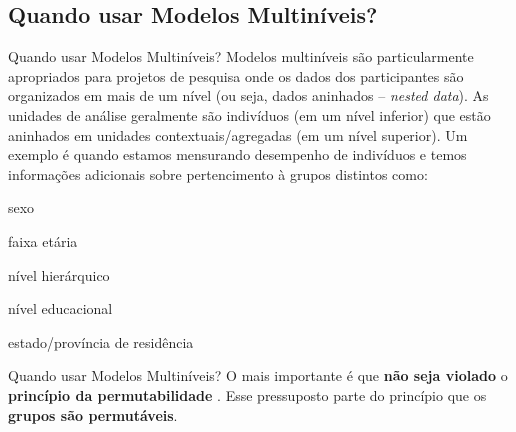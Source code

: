 \subsection{Quando usar Modelos Multiníveis?}
\begin{frame}{Quando usar Modelos Multiníveis?}
    Modelos multiníveis são particularmente apropriados para projetos de pesquisa
    onde os dados dos participantes são organizados em mais de um nível
    (ou seja, dados aninhados -- \textit{nested data}).
    As unidades de análise geralmente são indivíduos (em um nível inferior)
    que estão aninhados em unidades contextuais/agregadas (em um nível superior).
    \vfill
    \small
    Um exemplo é quando estamos mensurando desempenho de indivíduos e temos
    informações adicionais sobre pertencimento à grupos distintos como:
    \begin{vfilleditems}
        \item \small sexo
        \item \small faixa etária
        \item \small nível hierárquico
        \item \small nível educacional
        \item \small estado/província de residência
    \end{vfilleditems}
\end{frame}

\begin{frame}{Quando usar Modelos Multiníveis?}
    O mais importante é que \textbf{não seja violado} o \textbf{princípio da permutabilidade}
    \parencite{definettiTheoryProbability1974}.
    \vfill
    Esse pressuposto parte do princípio que os \textbf{grupos são permutáveis}.
\end{frame}

